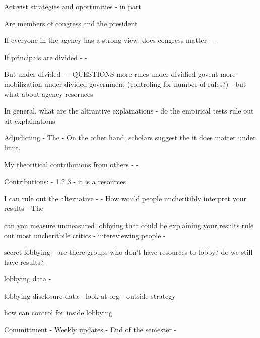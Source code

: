 Activist strategies and oportunities 
- in part 


Are members of congress and the president 

If everyone in the agency has a strong view, does congress matter 
- 
- 

If principals are divided
- 
- 

But under divided
- 
- 
QUESTIONS 
more rules under dividied govent
more mobilization under divided government (controling for number of rules?) 
- but what about agency resoruces 

In general, what are the altrantive explainations 
- do the empirical tests rule out alt explainations 




Adjudicting 
- The  
- 
On the other hand, scholars suggest the it does matter under limit.

My theoritical contributions from others 
- 
- 

Contributions: 
- 1 2 3 
- it is a resources 

I can rule out the alternative 
- 
- 
How would people uncheritibly interpret your results 
- The

can you measure unmeasured lobbying that could be explaining your results 
rule out most uncheritbile critics 
- intereviewing people 
- 

secret lobbying 
- are there groups who don't have resources to lobby? do we still have results? 
- 

lobbying data
- 

lobbying disclosure data 
- look at org 
- outside strategy 

how can control for inside lobbying 


Committment 
- Weekly updates 
- End of the semester
- 


% 

% 
% 
% 




